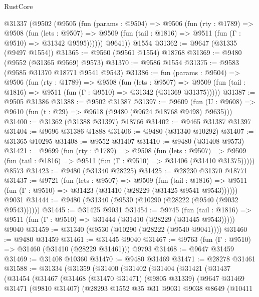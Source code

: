 \begin{lexlean}{RustCore}
\begin{coremodule}
    @31337
      (@9502
        (@9505
          (fun (params : @9504) =>
          @9506
            (fun (rty : @1789) =>
            @9508
              (fun (lets : @9507) =>
              @9509 (fun (tail : @1816) => @9511 (fun (Γ : @9510) => @31342 @9595))))))
        @9641))
    @1554
@31362 := @9647 (@31335 (@9497 @1554))
@31365 := @9560 (@9561 @1554) @18768
@31369 := @9480 (@9552 (@31365 @9569) @9573)
@31370 := @9586 @1554
@31375 := @9583 (@9585 @31370 @18771 @9541 @9543)
@31386 := fun (params : @9504) =>
  @9506
    (fun (rty : @1789) =>
    @9508
      (fun (lets : @9507) =>
      @9509 (fun (tail : @1816) => @9511 (fun (Γ : @9510) => @31342 (@31369 @31375)))))
@31387 := @9505 @31386
@31388 := @9502 @31387
@31397 := @9609
    (fun (U : @9608) => @9610 (fun (t : @29) => @9618 (@9480 (@9624 @18768 @9498) @9635)))
@31400 := @31362 (@31388 @31397) @18766
@31402 := @9465 @31387 @31397
@31404 := @9696 @31386 @1888
@31406 := @9480 (@31340 @10292)
@31407 := @31365 @10295
@31408 := @9552 @31407
@31410 := @9480 (@31408 @9573)
@31421 := @9699
    (fun (rty : @1789) =>
    @9508
      (fun (lets : @9507) =>
      @9509 (fun (tail : @1816) => @9511 (fun (Γ : @9510) => @31406 (@31410 @31375)))))
    @8573
@31423 := @9480 (@31340 @28225)
@31425 := @28230 @31370 @18771
@31437 := @9721
    (fun (lets : @9507) =>
    @9509
      (fun (tail : @1816) =>
      @9511 (fun (Γ : @9510) => @31423 (@31410 (@28229 (@31425 @9541 @9543))))))
    @9031
@31444 := @9480 (@31340 (@9530 (@10290 (@28222 (@9540 (@9032 @9543))))))
@31445 := @31425 @9031
@31454 := @9745
    (fun (tail : @1816) => @9511 (fun (Γ : @9510) => @31444 (@31410 (@28229 (@31445 @9543)))))
    @9040
@31459 := @31340 (@9530 (@10290 (@28222 (@9540 @9041))))
@31460 := @9480 @31459
@31461 := @31445 @9040
@31467 := @9763 (fun (Γ : @9510) => @31460 (@31410 (@28229 @31461))) @9793
@31468 := @9647 @31459
@31469 := @31408 @10360
@31470 := @9480 @31469
@31471 := @28278 @31461
@31588 := @31334
    (@31359
      (@31400
        (@31402
          (@31404
            (@31421
              (@31437
                (@31454
                  (@31467
                    (@31468
                      (@31470 @31471)
                      (@9805 @31339)
                      (@9647
                        @31469
                        @31471
                        (@9810 @31407)
                        (@28293
                          @1552
                          @35
                          @31
                          @9031
                          @9038
                          @8649
                          (@10411

\end{coremodule}
\end{lexlean}
